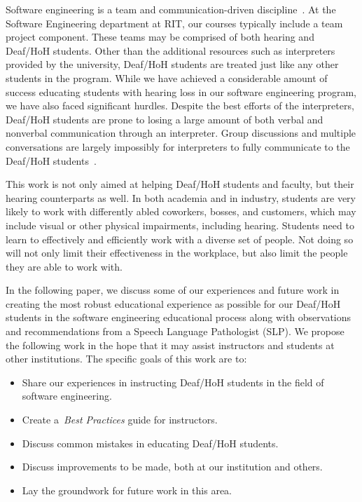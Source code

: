 \documentclass[conference]{IEEEtran}
\begin{document}
Software engineering is a team and communication-driven discipline~\cite{Pieterse:2006:SET:1216262.1216282}. At the Software Engineering department at RIT, our courses typically include a team project component. These teams may be comprised of both hearing and Deaf/HoH students. Other than the additional resources such as interpreters provided by the university, Deaf/HoH students are treated just like any other students in the program. While we have achieved a considerable amount of success educating students with hearing loss in our software engineering program, we have also faced significant hurdles. Despite the best efforts of the interpreters, Deaf/HoH students are prone to losing a large amount of both verbal and nonverbal communication through an interpreter. Group discussions and multiple conversations are largely impossibly for interpreters to fully communicate to the Deaf/HoH students~\cite{johnhopkins_data_URL}.

This work is not only aimed at helping Deaf/HoH students and faculty, but their hearing counterparts as well. In both academia and in industry, students are very likely to work with differently abled coworkers, bosses, and customers, which may include visual or other physical impairments, including hearing. Students need to learn to effectively and efficiently work with a diverse set of people. Not doing so will not only limit their effectiveness in the workplace, but also limit the people they are able to work with.

In the following paper, we discuss some of our experiences and future work in creating the most robust educational experience as possible for our Deaf/HoH students in the software engineering educational process along with observations and recommendations from a Speech Language Pathologist (SLP). We propose the following work in the hope that it may assist instructors and students at other institutions.  The specific goals of this work are to:

\begin{itemize}
\itemsep.5em
  \item Share our experiences in instructing Deaf/HoH students in the field of software engineering.
  \item Create a~\emph{Best Practices} guide for instructors.
  \item Discuss common mistakes in educating Deaf/HoH students.
  \item Discuss improvements to be made, both at our institution and others.
  \item Lay the groundwork for future work in this area.
\end{itemize}
\end{document}
